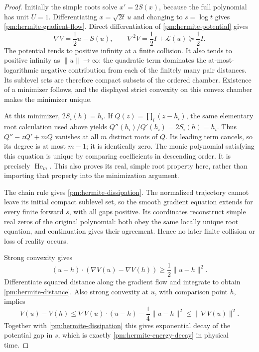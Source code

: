 \begin{proof}
Initially the simple roots solve \(x'=2S(x)\), because the full
polynomial has unit \(U=1\).  Differentiating \(x=\sqrt{2t}\,u\)
and changing to \(s=\log t\) gives
\eqref{pm:hermite-gradient-flow}.  Direct differentiation of
\eqref{pm:hermite-potential} gives
\[
 \nabla V=\frac12u-S(u),\qquad
 \nabla^2V=\frac12I+\mathcal L(u)\succeq\frac12I.
\]
The potential tends to positive infinity at a finite collision.
It also tends to positive infinity as \(\|u\|\to\infty\): the
quadratic term dominates the at-most-logarithmic negative contribution
from each of the finitely many pair distances.  Its sublevel sets are
therefore compact subsets of the ordered chamber.  Existence of a
minimizer follows, and the displayed strict convexity on this convex
chamber makes the minimizer unique.

At this minimizer, \(2S_i(h)=h_i\).  If
\(Q(z)=\prod_i(z-h_i)\), the same elementary root calculation used
above yields \(Q''(h_i)/Q'(h_i)=2S_i(h)=h_i\).  Thus
\(Q''-zQ'+mQ\) vanishes at all \(m\) distinct roots of \(Q\).
Its leading term cancels, so its degree is at most \(m-1\); it is
identically zero.  The monic polynomial satisfying this equation is
unique by comparing coefficients in descending order.  It is precisely
\(\operatorname{He}_m\).  This also proves its real, simple root
property here, rather than importing that property into the minimization
argument.

The chain rule gives \eqref{pm:hermite-dissipation}.  The normalized
trajectory cannot leave its initial compact sublevel set, so the smooth
gradient equation extends for every finite forward \(s\), with all
gaps positive.  Its coordinates reconstruct simple real zeros of the
original polynomial: both obey the same locally unique root equation,
and continuation gives their agreement.  Hence no later finite collision
or loss of reality occurs.

Strong convexity gives
\[
 (u-h)\mathbin{\cdot}(\nabla V(u)-\nabla V(h))
       \ge\frac12\|u-h\|^2.
\]
Differentiate squared distance along the gradient flow and integrate to
obtain \eqref{pm:hermite-distance}.  Also strong convexity at \(u\),
with comparison point \(h\), implies
\[
 V(u)-V(h)
 \le \nabla V(u)\mathbin{\cdot}(u-h)-\frac14\|u-h\|^2
 \le\|\nabla V(u)\|^2.
\]
Together with \eqref{pm:hermite-dissipation} this gives exponential
decay of the potential gap in \(s\), which is exactly
\eqref{pm:hermite-energy-decay} in physical time.
\end{proof}

